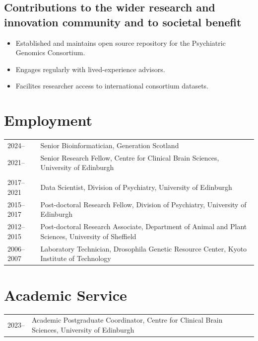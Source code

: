 \documentclass[11pt]{article}
\begin{document}
\subsection*{Contributions to the wider research and innovation community and to societal benefit}

\begin{itemize}
  \item Established and maintains open source repository for the Psychiatric Genomics Consortium.
  \item Engages regularly with lived-experience advisors.
  \item Facilites researcher access to international consortium datasets.
\end{itemize}


\section*{Employment}

\begin{tabular}{p{3cm}p{12cm}}
  
2024-- & Senior Bioinformatician, Generation Scotland \\

2021-- & Senior Research Fellow, Centre for Clinical Brain Sciences, University of Edinburgh \\ \\

2017--2021 & Data Scientist, Division of Psychiatry, University of Edinburgh \\

2015--2017 & Post-doctoral Research Fellow, Division of Psychiatry, University of Edinburgh \\

2012--2015 & Post-doctoral Research Associate, Department of Animal and Plant Sciences, University of Sheffield \\

2006--2007 & Laboratory Technician, Drosophila Genetic Resource Center, Kyoto Institute of Technology

\end{tabular}

\section*{Academic Service}

\begin{tabular}{p{3cm}p{12cm}}
  
2023-- & Academic Postgraduate Coordinator, Centre for Clinical Brain Sciences, University of Edinburgh

\end{tabular}
\end{document}

